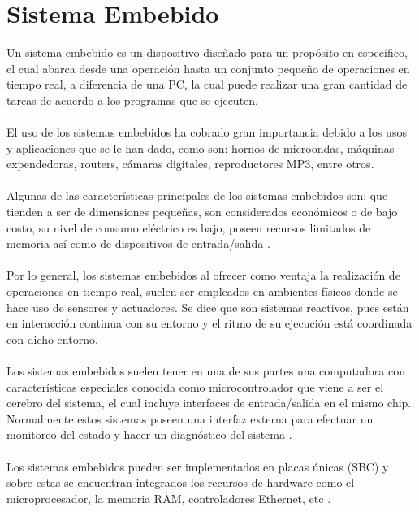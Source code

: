 \section{Sistema Embebido}
Un sistema embebido es un dispositivo diseñado para un propósito en específico, el cual abarca desde una operación hasta un conjunto pequeño de operaciones en tiempo real, a diferencia de una PC, la cual puede realizar una gran cantidad de tareas de acuerdo a los programas que se ejecuten. 
\paragraph{}
El uso de los sistemas embebidos ha cobrado gran importancia debido a los usos y aplicaciones que se le han dado, como son: hornos de microondas, máquinas expendedoras, routers, cámaras digitales, reproductores MP3, entre otros. 
\paragraph{}
Algunas de las características principales de los sistemas embebidos son: que tienden a ser de dimensiones pequeñas, son considerados económicos o de bajo costo, su nivel de consumo eléctrico es bajo, poseen recursos limitados de memoria así como de dispositivos de entrada/salida \citep{MarcoTeorico14}.
\paragraph{}
Por lo general, los sistemas embebidos al ofrecer como ventaja la realización de operaciones en tiempo real, suelen ser empleados en ambientes físicos donde se hace uso de sensores y actuadores. Se dice que son sistemas reactivos, pues están en interacción continua con su entorno y el ritmo de su ejecución está coordinada con dicho entorno. 
\paragraph{}
Los sistemas embebidos suelen tener en una de sus partes una computadora con características especiales conocida como microcontrolador que viene a ser el cerebro del sistema, el cual incluye interfaces de entrada/salida en el mismo chip. Normalmente estos sistemas poseen una interfaz externa para efectuar un monitoreo del estado y hacer un diagnóstico del sistema \citep{MarcoTeorico15}.
\paragraph{}
Los sistemas embebidos pueden ser implementados en placas únicas (SBC) y sobre estas se encuentran integrados los recursos de hardware como el microprocesador, la memoria RAM, controladores Ethernet, etc \citep{MarcoTeorico14}.
